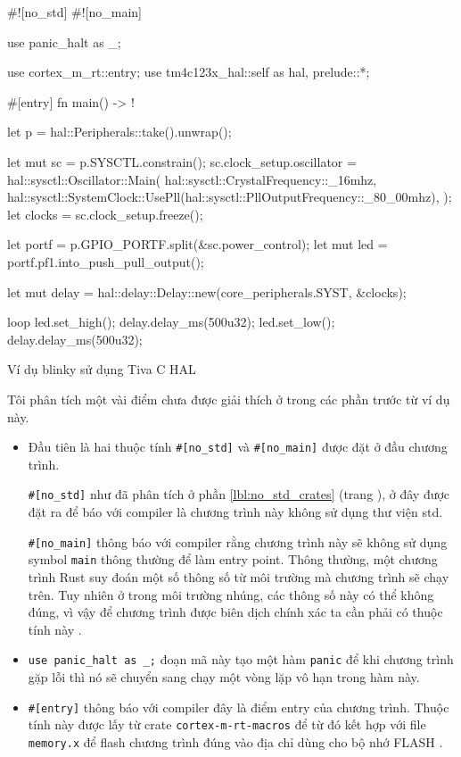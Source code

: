 \begin{listing}[ht]
\begin{rustcode}
#![no_std]
#![no_main]

use panic_halt as _;

use cortex_m_rt::entry;
use tm4c123x_hal::{self as hal, prelude::*};

#[entry]
fn main() -> ! {
    let p = hal::Peripherals::take().unwrap();

    let mut sc = p.SYSCTL.constrain();
    sc.clock_setup.oscillator = hal::sysctl::Oscillator::Main(
        hal::sysctl::CrystalFrequency::_16mhz,
        hal::sysctl::SystemClock::UsePll(hal::sysctl::PllOutputFrequency::_80_00mhz),
    );
    let clocks = sc.clock_setup.freeze();

    let portf = p.GPIO_PORTF.split(&sc.power_control);
    let mut led = portf.pf1.into_push_pull_output();

    let mut delay = hal::delay::Delay::new(core_peripherals.SYST, &clocks);

    loop {
        led.set_high();
        delay.delay_ms(500u32);
        led.set_low();
        delay.delay_ms(500u32);
    }
}
\end{rustcode}
\caption{Ví dụ blinky sử dụng Tiva C HAL}
\label{code:tivac_hal_blinky}
\end{listing}

Tôi phân tích một vài điểm chưa được giải thích ở trong các phần trước từ ví dụ này.

\begin{itemize}
    \item Đầu tiên là hai thuộc tính \texttt{#[no_std]} và \texttt{#[no_main]} được đặt ở đầu chương trình.

        \texttt{#[no_std]} như đã phân tích ở phần \ref{lbl:no_std_crates} (trang \pageref{lbl:no_std_crates}), ở đây được đặt ra để báo với compiler là chương trình này không sử dụng thư viện std.

    \texttt{#[no_main]} thông báo với compiler rằng chương trình này sẽ không sử dụng symbol \texttt{main} thông thường để làm entry point. Thông thường, một chương trình Rust suy đoán một số thông số từ môi trường mà chương trình sẽ chạy trên. Tuy nhiên ở trong môi trường nhúng, các thông số này có thể không đúng, vì vậy để chương trình được biên dịch chính xác ta cần phải có thuộc tính này \cite{rust_reference, embedonomicon}.

    \item \texttt{use panic_halt as _;} đoạn mã này tạo một hàm \texttt{panic} để khi chương trình gặp lỗi thì nó sẽ chuyển sang chạy một vòng lặp vô hạn trong hàm này.
    \item \texttt{#[entry]} thông báo với compiler đây là điểm entry của chương trình.
        Thuộc tính này được lấy từ crate \texttt{cortex-m-rt-macros} để từ đó kết hợp với file \texttt{memory.x} để flash chương trình đúng vào địa chỉ dùng cho bộ nhớ FLASH \cite{cortex_m_rt}.
\end{itemize}

